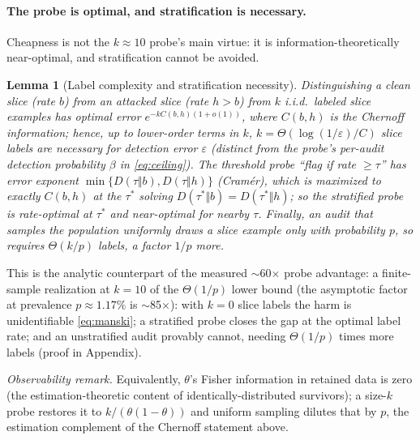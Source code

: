 \documentclass[conference]{IEEEtran}
\newtheorem{lemma}{Lemma}
\begin{document}
\paragraph{The probe is optimal, and stratification is necessary.} Cheapness is not the $k{\approx}10$ probe's main virtue: it is information-theoretically near-optimal, and stratification cannot be avoided.
\begin{lemma}[Label complexity and stratification necessity]
\label{thm:lowerbound}
Distinguishing a clean slice (rate $b$) from an attacked slice (rate $h>b$) from $k$ i.i.d.\ labeled slice
examples has optimal error $e^{-kC(b,h)(1+o(1))}$, where $C(b,h)$ is the Chernoff information; hence, up to
lower-order terms in $k$, $k=\Theta(\log(1/\varepsilon)/C)$ slice labels are necessary for detection error
$\varepsilon$ (distinct from the probe's per-audit detection probability $\beta$ in \eqref{eq:ceiling}).
The threshold probe ``flag if rate $\ge\tau$'' has error exponent $\min\{D(\tau\Vert b),D(\tau\Vert h)\}$
(Cram\'er), which is maximized to \emph{exactly} $C(b,h)$ at the $\tau^\ast$ solving $D(\tau^\ast\Vert b)=
D(\tau^\ast\Vert h)$; so the stratified probe is rate-optimal at $\tau^\ast$ and near-optimal for nearby $\tau$.
Finally, an audit that samples the population \emph{uniformly} draws a slice example only with probability $p$,
so requires $\Theta(k/p)$ labels, a factor $1/p$ more.
\end{lemma}
\noindent This is the analytic counterpart of the measured $\sim$60$\times$ probe advantage: a finite-sample
realization at $k{=}10$ of the $\Theta(1/p)$ lower bound (the asymptotic factor at prevalence $p{\approx}1.17\%$
is $\sim$85$\times$): with $k{=}0$ slice labels the harm is unidentifiable \eqref{eq:manski}; a stratified
probe closes the gap at the optimal label rate; and an unstratified audit provably cannot, needing $\Theta(1/p)$
times more labels (proof in Appendix).

\emph{Observability remark.} Equivalently, $\theta$'s Fisher information in retained data is zero (the
estimation-theoretic content of identically-distributed survivors); a size-$k$ probe restores it to
$k/(\theta(1{-}\theta))$ and uniform sampling dilutes that by $p$, the estimation complement of the Chernoff
statement above.
\end{document}
